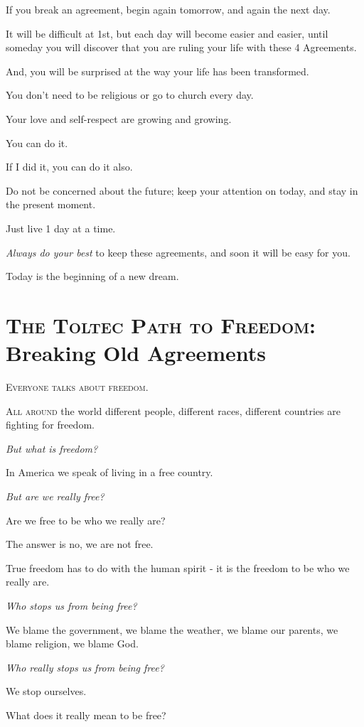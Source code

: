 \documentclass{article}
\numberwithin{equation}{section}
\begin{document}
%
If you break an agreement, begin again tomorrow, and again the next day.

It will be difficult at 1st, but each day will become easier and easier, until someday you will discover that you are ruling your life with these 4 Agreements.

And, you will be surprised at the way your life has been transformed.

%
You don't need to be religious or go to church every day.

Your love and self-respect are growing and growing.

You can do it.

If I did it, you can do it also.

Do not be concerned about the future; keep your attention on today, and stay in the present moment.

Just live 1 day at a time.

\textit{Always do your best} to keep these agreements, and soon it will be easy for you.

Today is the beginning of a new dream.

\section{\textsc{The Toltec Path to Freedom}: Breaking Old Agreements}
\textsc{Everyone talks about freedom}.

\textsc{All around} the world different people, different races, different countries are fighting for freedom.

\textit{But what is freedom?}

In America we speak of living in a free country.

\textit{But are we really free?}

Are we free to be who we really are?

The answer is no, we are not free.

True freedom has to do with the human spirit - it is the freedom to be who we really are.

%
\textit{Who stops us from being free?}

We blame the government, we blame the weather, we blame our parents, we blame religion, we blame God.

\textit{Who really stops us from being free?}

We stop ourselves.

What does it really mean to be free?
\end{document}
